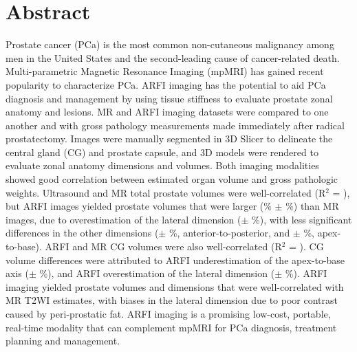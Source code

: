 \section*{Abstract}
Prostate cancer (PCa) is the most common non-cutaneous malignancy among men in
the United States and the second-leading cause of cancer-related death.
Multi-parametric Magnetic Resonance Imaging (mpMRI) has gained recent
popularity to characterize PCa.  ARFI imaging has the potential to aid PCa
diagnosis and management by using tissue stiffness to evaluate prostate zonal
anatomy and lesions.  MR and ARFI \invivo imaging datasets were compared to one
another and with gross pathology measurements made immediately after radical
prostatectomy.  Images were manually segmented in 3D Slicer to delineate the
central gland (CG) and prostate capsule, and 3D models were rendered to
evaluate zonal anatomy dimensions and volumes.  Both imaging modalities showed
good correlation between estimated organ volume and gross pathologic weights.
Ultrasound and MR total prostate volumes were well-correlated (R$^2$ =
\MRarfiVolTotalRsq), but ARFI images yielded prostate volumes that were larger
(\MRarfiVolTotalMeanDiff\% $\pm$ \MRarfiVolTotalStdDiff\%) than MR images, due
to overestimation of the lateral dimension (\ARFImrTotalLatLatMeanPct $\pm$
\ARFImrTotalLatLatStdPct\%), with less significant differences in the other
dimensions (\ARFImrTotalAntPostMeanPct $\pm$ \ARFImrTotalAntPostStdPct\%,
anterior-to-posterior, and \ARFImrTotalApexBaseMeanPct $\pm$
\ARFImrTotalApexBaseStdPct\%, apex-to-base).  ARFI and MR CG volumes were also
well-correlated (R$^2$ = \MRarfiVolCentralRsq).  CG volume differences were
attributed to ARFI underestimation of the apex-to-base axis
(\ARFImrCentralApexBaseMeanPct $\pm$ \ARFImrCentralApexBaseStdPct\%), and ARFI
overestimation of the lateral dimension (\ARFImrCentralLatLatMeanPct $\pm$
\ARFImrCentralLatLatStdPct\%).  ARFI imaging yielded prostate volumes and
dimensions that were well-correlated with MR T2WI estimates, with biases in the
lateral dimension due to poor contrast caused by peri-prostatic fat.  ARFI
imaging is a promising low-cost, portable, real-time modality that can
complement mpMRI for PCa diagnosis, treatment planning and management.
